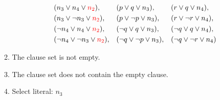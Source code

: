 \documentclass[11pt,a4paper]{article}
\begin{document}
\begin{enumerate}
\begin{enumerate}
\begin{enumerate}
\begin{align*}
&(n_3 \lor n_4 \lor \textcolor{red}{n_2}),& & (p\lor q \lor n_3),  && (r \lor q \lor n_4), \\
&(n_3 \lor \neg  n_3 \lor \textcolor{red}{n_2}) ,  & & (p \lor \neg p \lor n_3), & & (r \lor \neg r \lor n_4), \\
&(\neg n_4 \lor  n_4 \lor \textcolor{red}{n_2}) , & & (\neg q \lor q \lor n_3),& & (\neg q \lor q \lor n_4), \\
&(\neg n_4 \lor  \neg  n_3 \lor \textcolor{red}{n_2}), && (\neg q \lor \neg p \lor n_3), & & (\neg q \lor \neg r \lor n_4)
\end{align*}
\end{enumerate}
\item The clause set is not empty.
\item The clause set does not contain the empty clause.
\item Select literal: $n_3$
\end{enumerate}





\end{enumerate}
\end{document}
